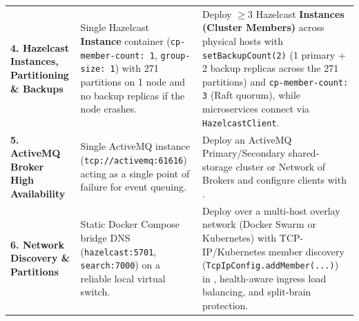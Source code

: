\documentclass[10pt,a4paper]{article}
\begin{document}
\begin{table}[!htbp]
\begin{tabularx}{\textwidth}{L{3.0cm} L{5.0cm} Y}
\addlinespace[2pt]
\textbf{4. Hazelcast Instances, Partitioning \& Backups} & Single Hazelcast \textbf{Instance} container (\texttt{cp-member-count: 1}, \texttt{group-size: 1}) with 271 partitions on 1 node and no backup replicas if the node crashes. & Deploy $\ge 3$ Hazelcast \textbf{Instances (Cluster Members)} across physical hosts with \texttt{setBackupCount(2)} (1 primary + 2 backup replicas across the 271 partitions) and \texttt{cp-member-count: 3} (Raft quorum), while microservices connect via \texttt{HazelcastClient}. \\
\addlinespace[2pt]
\textbf{5. ActiveMQ Broker High Availability} & Single ActiveMQ instance (\texttt{tcp://activemq:61616}) acting as a single point of failure for event queuing. & Deploy an ActiveMQ Primary/Secondary shared-storage cluster or Network of Brokers and configure clients with . \\
\addlinespace[2pt]
\textbf{6. Network Discovery \& Partitions} & Static Docker Compose bridge DNS (\texttt{hazelcast:5701}, \texttt{search:7000}) on a reliable local virtual switch. & Deploy over a multi-host overlay network (Docker Swarm or Kubernetes) with TCP-IP/Kubernetes member discovery (\texttt{TcpIpConfig.addMember(...)}) in , health-aware ingress load balancing, and split-brain protection. \\
\bottomrule
\end{tabularx}
\end{table}
\end{document}
